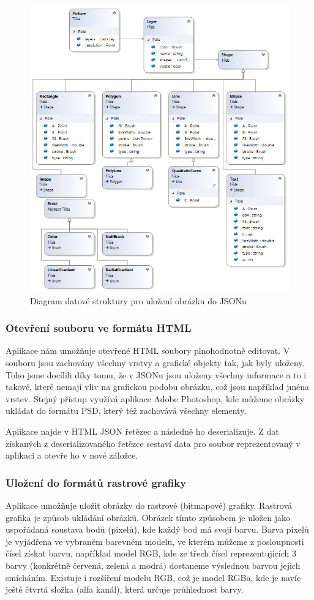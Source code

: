 \documentclass[
  field=inf,
  biblatex,
  glossaries,
  index
]{kidiplom}
\begin{document}
\begin{figure}
\includegraphics[width=15cm]{img/json_diag}
\caption{Diagram datové struktury pro uložení obrázku do JSONu}
\label{fig:json_diag}
\end{figure} 


\subsubsection{Otevření souboru ve formátu HTML}
Aplikace nám umožňuje otevřené HTML soubory plnohodnotně editovat. V souboru jsou zachovány všechny vrstvy a grafické objekty tak, jak byly uloženy. Toho jsme docílili díky tomu, že v JSONu jsou uloženy všechny informace a to i takové, které nemají vliv na grafickou podobu obrázku, což jsou například jména vrstev. Stejný přístup využívá aplikace Adobe Photoshop, kde můžeme obrázky ukládat do formátu PSD, který též zachovává všechny elementy.

Aplikace najde v HTML JSON řetězec a následně ho deserializuje. Z dat získaných z deserializovaného řetězce sestaví data pro soubor reprezentovaný v aplikaci a otevře ho v nové záložce.

\subsubsection{Uložení do formátů rastrové grafiky}
Aplikace umožňuje uložit obrázky do rastrové (bitmapové) grafiky. Rastrová grafika je způsob ukládání obrázků. Obrázek tímto způsobem je uložen jako uspořádaná soustava bodů (pixelů), kde každý bod má svojí barvu. Barva pixelů je vyjádřena ve vybraném barevném modelu, ve kterém můžeme z posloupnosti čísel získat barvu, například model RGB, kde ze třech čísel reprezentujících 3 barvy (konkrétně červená, zelená a modrá) dostaneme výslednou barvou jejich smícháním. Existuje i rozšíření modelu RGB, což je model RGBa, kde je navíc ještě čtvrtá složka (alfa kanál), která určuje průhlednost barvy.
\end{document}
